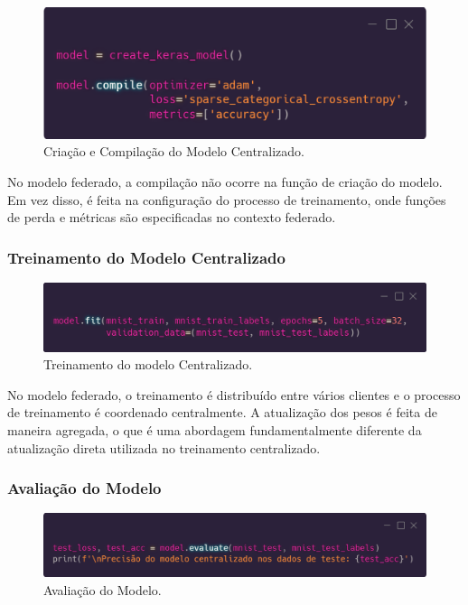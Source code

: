 \begin{figure}[ht]
    \centering
    \includegraphics[scale=0.25]{figuras/desenvolvimento/compileModelCentralized.eps}
    \caption{Criação e Compilação do Modelo Centralizado.}
    \label{fig:compileModelCentralized}
\end{figure}

No modelo federado, a compilação não ocorre na função de criação do modelo. Em vez disso, é feita na configuração do processo de treinamento, onde funções de perda e métricas são especificadas no contexto federado.

\subsubsection{Treinamento do Modelo Centralizado}

\begin{figure}[ht]
    \centering
    \includegraphics[scale=0.25]{figuras/desenvolvimento/trainingCentralized.eps}
    \caption{Treinamento do modelo Centralizado.}
    \label{fig:trainingCentralized}
\end{figure}

No modelo federado, o treinamento é distribuído entre vários clientes e o processo de treinamento é coordenado centralmente. A atualização dos pesos é feita de maneira agregada, o que é uma abordagem fundamentalmente diferente da atualização direta utilizada no treinamento centralizado.

\subsubsection{Avaliação do Modelo}

\begin{figure}[ht]
    \centering
    \includegraphics[scale=0.25]{figuras/desenvolvimento/testCentralized.eps}
    \caption{Avaliação do Modelo.}
    \label{fig:testCentralized}
\end{figure}

